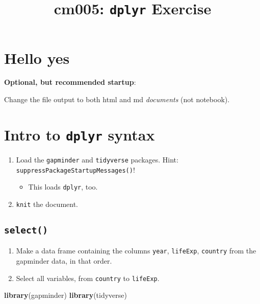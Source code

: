 \documentclass[]{article}
\title{cm005: \texttt{dplyr} Exercise}
\author{}
\date{}
\newenvironment{Shaded}{\begin{snugshade}}{\end{snugshade}}
\newcommand{\KeywordTok}[1]{\textcolor[rgb]{0.13,0.29,0.53}{\textbf{{#1}}}}
\newcommand{\NormalTok}[1]{{#1}}
\providecommand{\tightlist}{%
  \setlength{\itemsep}{0pt}\setlength{\parskip}{0pt}}
\begin{document}
\maketitle

\section{Hello yes}\label{hello-yes}

\textbf{Optional, but recommended startup}:

Change the file output to both html and md \emph{documents} (not
notebook).

\section{\texorpdfstring{Intro to \texttt{dplyr}
syntax}{Intro to dplyr syntax}}\label{intro-to-dplyr-syntax}

\begin{enumerate}
\def\labelenumi{\arabic{enumi}.}
\tightlist
\item
  Load the \texttt{gapminder} and \texttt{tidyverse} packages. Hint:
  \texttt{suppressPackageStartupMessages()}!

  \begin{itemize}
  \tightlist
  \item
    This loads \texttt{dplyr}, too.
  \end{itemize}
\item
  \texttt{knit} the document.
\end{enumerate}

\subsection{\texorpdfstring{\texttt{select()}}{select()}}\label{select}

\begin{enumerate}
\def\labelenumi{\arabic{enumi}.}
\item
  Make a data frame containing the columns \texttt{year},
  \texttt{lifeExp}, \texttt{country} from the gapminder data, in that
  order.
\item
  Select all variables, from \texttt{country} to \texttt{lifeExp}.
\end{enumerate}

\begin{Shaded}
\begin{Highlighting}[]
\KeywordTok{library}\NormalTok{(gapminder)}
\KeywordTok{library}\NormalTok{(tidyverse)}
\end{Highlighting}
\end{Shaded}
\end{document}
